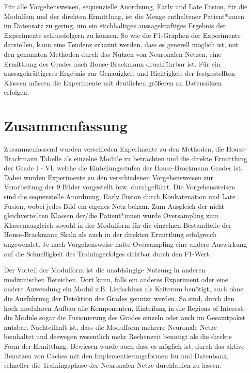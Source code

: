 Für alle Vorgehensweisen, sequenzielle Anordnung, Early und Late Fusion, für die Modulfom und der direkten Ermittlung, ist die Menge enthaltener Patient*innen im Datensatz zu gering, um ein stichhaltiges aussagekräftiges Ergebnis der Experimente schlussfolgern zu können. So wie die F1-Graphen der Experimente darstellen, kann eine Tendenz erkannt werden, dass es generell möglich ist, mit den genannten Methoden durch das Nutzen von Neuronalen Netzen, eine Ermittlung des Grades nach House-Brackmann druchführbar ist. Für ein aussagekräftigeres Ergebnis zur Genauigkeit und Richtigkeit der festgestellten Klassen müssen die Experimente mit deutlichen größeren an Datensätzen erfolgen.












\clearpage
\section{Zusammenfassung}\label{conclude}
Zusammenfassend wurden verschieden Experimente zu den Methoden, die House-Brackmann Tabelle als einzelne Module zu betrachten und die direkte Ermittlung der Grade I - VI, welche die Einteilungsstufen der House-Brackmann Grades ist. Dabei wurden Experimente zu den verschiedenen Vorgehensweisen zur Verarbeitung der 9 Bilder vorgestellt bzw. durchgeführt. Die Vorgehensweisen sind die sequenzielle Anordnung, Early Fusion durch Konkatenation und Late Fusion, wobei jedes Bild ein eigenes Netz bekam. Zum Ausgleich der nicht gleichverteilten Klassen der/die Patient*innen wurde Oversampling zum Klassenausgleich sowohl in der Modulform für die einzelnen Bestandteile der House-Brackmann Skala als auch in der direkten Ermittlung erfolgreich angewendet. Je nach Vorgehensweise hatte Oversampling eine andere Auswirkung auf die Schnelligkeit des Trainingerfolges sichtbar durch den F1-Wert.

Der Vorteil der Modulform ist die unabhängige Nutzung in anderen medizinischen Bereichen. Dort kann, falls ein anderes Experiment oder eine andere Anwendung ein Modul z.B. Liedschluss als Kriterum benötigt, auch ohne die Ausführung der Detektion des Grades genutzt werden. So sind, durch den hoch modularen Aufbau alle Komponenten, Einteilung in die Regions of Interest, die Module sogar die Fusionierung des Grades einzeln oder auch im Gesamtpaket nutzbar. Nachteilhaft ist, dass die Modulform mehrere Neuronale Netze beinhaltet und deswegen wesentlich mehr Rechenzeit benötigt als die direkte Form der Ermittlung.
Bewiesen wurde auch dass es möglich ist, durch das aktive Benutzen von Caches mit den Implementierungsformen \ac{lru} und Datenbank, schneller die Trainingsphase der Neuronalen Netze durchlaufen zu lassen.

